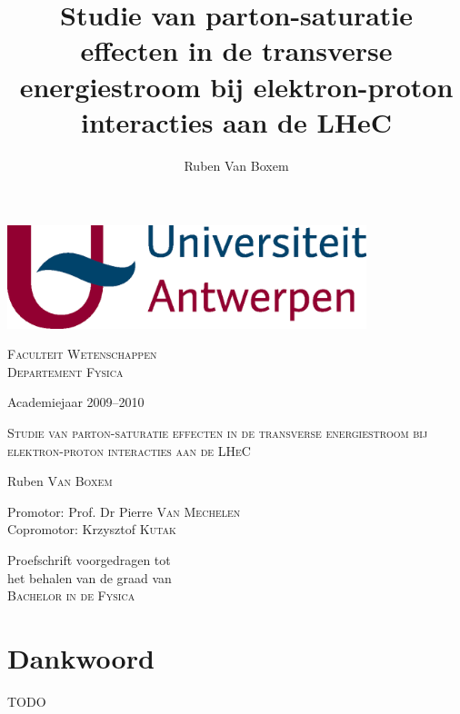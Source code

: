 \documentclass[a4paper,11pt]{article}
\title{Studie van parton-saturatie effecten in de transverse energiestroom bij elektron-proton interacties aan de LHeC}
\author{Ruben Van Boxem}
\numberwithin{equation}{section} %
\begin{document}
\fontsize{12pt}{14pt}\selectfont

\begin{center}

\includegraphics[height=3cm]{Afbeeldingen/UA.eps}

\vspace{1cm}

\fontsize{14pt}{17pt}\selectfont
\textsc{Faculteit Wetenschappen} \\
\textsc{Departement Fysica}
\fontsize{12pt}{14pt}\selectfont
\vspace{0.3cm}

\vspace{1.2cm}

Academiejaar 2009--2010

\vspace{2.8cm}

\fontsize{17.28pt}{21pt}\selectfont

\textsc{Studie van parton-saturatie effecten in de transverse energiestroom bij elektron-proton interacties aan de LHeC}

\fontsize{12pt}{14pt}\selectfont

\vspace{3cm}

Ruben \textsc{Van Boxem}	


\vspace{2cm}

Promotor: Prof. Dr Pierre \textsc{Van Mechelen}\\
Copromotor: Krzysztof \textsc{Kutak} \\
\vspace{2cm}
\end{center}
Proefschrift voorgedragen tot \\
het behalen van de graad van\\
\textsc{Bachelor in de Fysica}


\thispagestyle{empty}
\newpage

\section*{Dankwoord}
TODO
\thispagestyle{empty}
\newpage
\fontsize{11pt}{14pt}\selectfont
\end{document}
